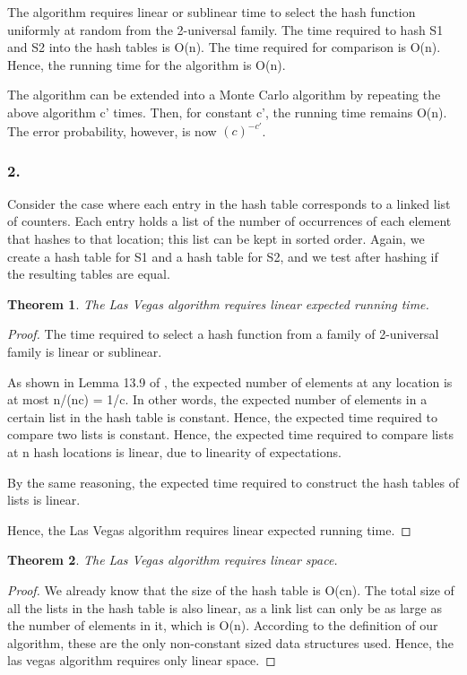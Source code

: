 \documentclass[10pt]{amsart}
\newtheorem{thm}{Theorem}[subsection]
\theoremstyle{remark}
\begin{document}
The algorithm requires linear or sublinear time to select the hash function uniformly at random from the 2-universal family. The time required to hash S1 and S2 into the hash tables is O(n). The time required for comparison is O(n). Hence, the running time for the algorithm is O(n).

The algorithm can be extended into a Monte Carlo algorithm by repeating the above algorithm c' times. Then, for constant c', the running time remains O(n). The error probability, however, is now $(c)^{-c'}$.

\subsubsection{2.} 
Consider the case where each entry in the hash table corresponds to a linked list of counters. Each entry holds a list of the number of occurrences of each element that hashes to that location; this list can be kept in sorted order. Again, we create a hash table for S1 and a hash table for S2, and we test after hashing if the resulting tables are equal.

\begin{thm}
The Las Vegas algorithm requires linear expected running time.
\end{thm}
\begin{proof}
The time required to select a hash function from a family of 2-universal family is linear or sublinear.

As shown in Lemma 13.9 of \cite{mitzenmacherUpfal}, the expected number of elements at any location is at most n/(nc) = 1/c. In other words, the expected number of elements in a certain list in the hash table is constant. Hence, the expected time required to compare two lists is constant. Hence, the expected time required to compare lists at n hash locations is linear, due to linearity of expectations.

By the same reasoning, the expected time required to construct the hash tables of lists is linear.

Hence, the Las Vegas algorithm requires linear expected running time.

\end{proof}

\begin{thm}
The Las Vegas algorithm requires linear space.
\end{thm}
\begin{proof}
We already know that the size of the hash table is O(cn). The total size of all the lists in the hash table is also linear, as a link list can only be as large as the number of elements in it, which is O(n). According to the definition of our algorithm, these are the only non-constant sized data structures used. Hence, the las vegas algorithm requires only linear space.
\end{proof}


\end{document}
